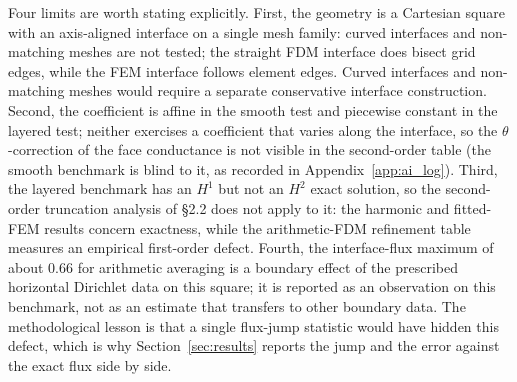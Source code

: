 Four limits are worth stating explicitly. First, the geometry is a Cartesian
square with an axis-aligned interface on a single mesh family: curved
interfaces and non-matching meshes are not tested; the straight FDM
interface does bisect grid edges, while the FEM interface follows element
edges. Curved interfaces and non-matching meshes would require a separate
conservative interface construction. Second, the coefficient is affine in the smooth test and
piecewise constant in the layered test; neither exercises a coefficient that
varies along the interface, so the $\theta$-correction of the face conductance
is not visible in the second-order table (the smooth benchmark is blind to it,
as recorded in Appendix~\ref{app:ai_log}). Third, the layered benchmark has an
$H^1$ but not an $H^2$ exact solution, so the second-order truncation analysis
of \S2.2 does not apply to it: the harmonic and fitted-FEM results concern exactness, while the
arithmetic-FDM refinement table measures an empirical first-order defect. Fourth, the
interface-flux maximum of about $0.66$ for arithmetic averaging is a boundary
effect of the prescribed horizontal Dirichlet data on this square; it is
reported as an observation on this benchmark, not as an estimate that transfers
to other boundary data. The methodological lesson is that a single flux-jump
statistic would have hidden this defect, which is why
Section~\ref{sec:results} reports the jump and the error against the exact flux
side by side.
